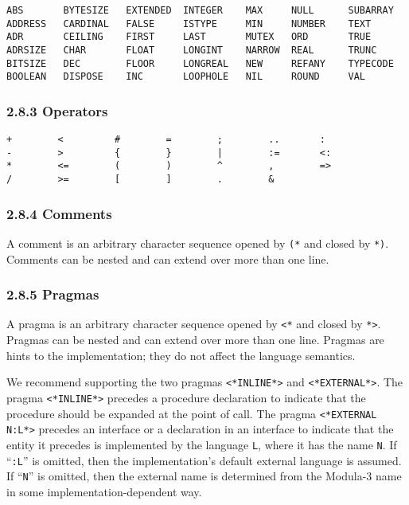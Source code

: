 \documentclass[10pt]{article}
\begin{document}
\begin{verbatim}
ABS       BYTESIZE   EXTENDED  INTEGER    MAX     NULL      SUBARRAY
ADDRESS   CARDINAL   FALSE     ISTYPE     MIN     NUMBER    TEXT
ADR       CEILING    FIRST     LAST       MUTEX   ORD       TRUE
ADRSIZE   CHAR       FLOAT     LONGINT    NARROW  REAL      TRUNC
BITSIZE   DEC        FLOOR     LONGREAL   NEW     REFANY    TYPECODE
BOOLEAN   DISPOSE    INC       LOOPHOLE   NIL     ROUND     VAL
\end{verbatim}

\subsubsection*{2.8.3 Operators}

\begin{verbatim}
+        <         #        =        ;        ..       :
-        >         {        }        |        :=       <:
*        <=        (        )        ^        ,        =>
/        >=        [        ]        .        &
\end{verbatim}

\subsubsection*{2.8.4 Comments}

A comment is an arbitrary character sequence opened by \verb|(*| and closed by
\verb|*)|.  Comments can be nested and can extend over more than one line.

\subsubsection*{2.8.5 Pragmas}

A pragma is an arbitrary character sequence opened by \verb|<*| and closed by
\verb|*>|.  Pragmas can be nested and can extend over more than one line.
Pragmas are hints to the implementation; they do not affect the language
semantics.

We recommend supporting the two pragmas \verb|<*INLINE*>| and
\verb|<*EXTERNAL*>|.  The pragma \verb|<*INLINE*>| precedes a procedure
declaration to indicate that the procedure should be expanded at the point of
call.  The pragma \verb|<*EXTERNAL| \verb|N:L*>| precedes an interface or a
declaration in an interface to indicate that the entity it precedes is
implemented by the language \verb|L|, where it has the name \verb|N|.  If
``\verb|:L|'' is omitted, then the implementation's default external language
is assumed.  If ``\verb|N|'' is omitted, then the external name is determined
from the Modula-3 name in some implementation-dependent way.
\end{document}
